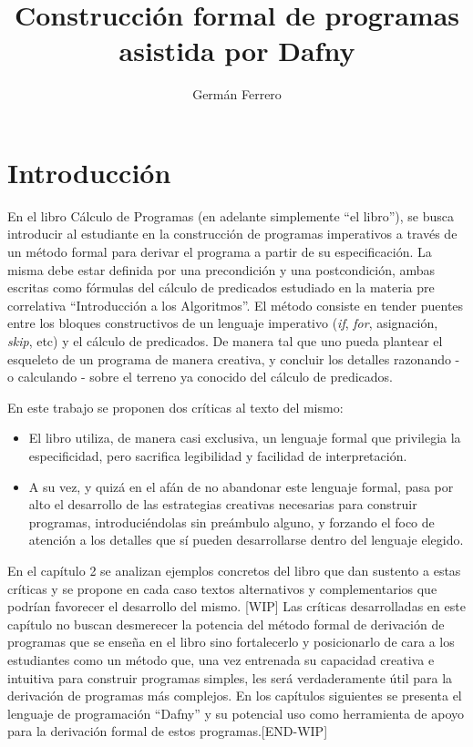 \documentclass[11pt, a4paper, openany]{book}
\author{Germán Ferrero}
\title{Construcción formal de programas asistida por Dafny}
\begin{document}
    \chapter{Introducción}
    En el libro Cálculo de Programas (en adelante simplemente ``el libro''), se busca introducir al estudiante en la construcción de programas imperativos a través de un método formal para derivar el programa a partir de su especificación. La misma debe estar definida por una precondición y una postcondición, ambas escritas como fórmulas del cálculo de predicados estudiado en la materia pre correlativa ``Introducción a los Algoritmos''. El método consiste en tender puentes entre los bloques constructivos de un lenguaje imperativo (\textit{if}, \textit{for}, asignación, \textit{skip}, etc) y el cálculo de predicados. De manera tal que uno pueda plantear el esqueleto de un programa de manera creativa, y concluir los detalles razonando - o calculando - sobre el terreno ya conocido del cálculo de predicados.

    En este trabajo se proponen dos críticas al texto del mismo:
    \begin{itemize}
    \item El libro utiliza, de manera casi exclusiva, un lenguaje formal que privilegia la especificidad, pero sacrifica legibilidad y facilidad de interpretación.
    \item A su vez, y quizá en el afán de no abandonar este lenguaje formal, pasa por alto el desarrollo de las estrategias creativas necesarias para construir programas, introduciéndolas sin preámbulo alguno, y forzando el foco de atención a los detalles que sí pueden desarrollarse dentro del lenguaje elegido.
    \end{itemize}

    En el capítulo 2 se analizan ejemplos concretos del libro que dan sustento a estas críticas y se propone en cada caso textos alternativos y complementarios que podrían favorecer el desarrollo del mismo.
    [WIP] Las críticas desarrolladas en este capítulo no buscan desmerecer la potencia del método formal de derivación de programas que se enseña en el libro sino fortalecerlo y posicionarlo de cara a los estudiantes como un método que, una vez entrenada su capacidad creativa e intuitiva para construir programas simples, les será verdaderamente útil para la derivación de programas más complejos.
    En los capítulos siguientes se presenta el lenguaje de programación ``Dafny'' y su potencial uso como herramienta de apoyo para la derivación formal de estos programas.[END-WIP]
\end{document}
